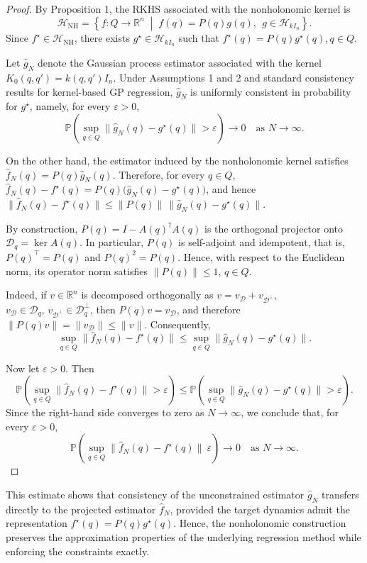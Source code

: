 \documentclass[letterpaper, 10 pt, conference]{ieeeconf}
\begin{document}
\begin{proof}
By Proposition 1, the RKHS associated with the nonholonomic kernel is
\[
\mathcal H_{\mathrm{NH}}
=
\left\{
f:Q\to\mathbb R^n
\;\middle|\;
f(q)=P(q)g(q),\ \ g\in\mathcal H_{kI_n}
\right\}.
\]
Since $f^\star\in\mathcal H_{\mathrm{NH}}$, there exists $g^\star\in\mathcal H_{kI_n}$ such that $f^\star(q)=P(q)g^\star(q)$,\,$q\in Q$.


Let $\hat g_N$ denote the Gaussian process estimator associated with the kernel
$K_0(q,q')=k(q,q')I_n$. Under Assumptions 1 and 2 and standard consistency results for kernel-based GP regression, $\hat g_N$ is uniformly consistent in probability for $g^\star$, namely, for every $\varepsilon>0$,
\[
\mathbb{P}\!\left(
\sup_{q\in Q}\|\hat g_N(q)-g^\star(q)\|>\varepsilon
\right)\to 0
\quad\text{as }N\to\infty.
\]

On the other hand, the estimator induced by the nonholonomic kernel satisfies
$\hat f_N(q)=P(q)\hat g_N(q)$. Therefore, for every $q\in Q$, $\hat f_N(q)-f^\star(q)
=
P(q)\bigl(\hat g_N(q)-g^\star(q)\bigr)$,
and hence $\|\hat f_N(q)-f^\star(q)\|
\le
\|P(q)\|\,\|\hat g_N(q)-g^\star(q)\|$.


By construction, $P(q)=I-A(q)^\dagger A(q)$ is the orthogonal projector onto  $\mathcal D_q=\ker A(q)$. In particular, $P(q)$ is self-adjoint and idempotent, that is, $P(q)^\top=P(q)$ and $P(q)^2=P(q)$. Hence, with respect to the Euclidean norm, its operator norm satisfies $\|P(q)\|\le 1$, $q\in Q$. 

Indeed, if $v\in\mathbb R^n$ is decomposed orthogonally as $v=v_{\mathcal D}+v_{\mathcal D^\perp}$,
$v_{\mathcal D}\in\mathcal D_q,\, v_{\mathcal D^\perp}\in\mathcal D_q^\perp$,
then $P(q)v=v_{\mathcal D}$, and therefore
$\|P(q)v\|=\|v_{\mathcal D}\|\le \|v\|.$ Consequently,
\[
\sup_{q\in Q}\|\hat f_N(q)-f^\star(q)\|
\le
\sup_{q\in Q}\|\hat g_N(q)-g^\star(q)\|.
\]

Now let $\varepsilon>0$. Then
\[
\mathbb{P}\!\left(
\sup_{q\in Q}\|\hat f_N(q)\!-\!f^\star(q)\|\!>\!\varepsilon\!
\right)
\!\le\!
\mathbb{P}\!\left(
\sup_{q\in Q}\|\hat g_N(q)\!-\!g^\star(q)\|\!>\!\varepsilon\!
\right)\!.
\]
Since the right-hand side converges to zero as $N\to\infty$, we conclude that, for every $\varepsilon>0$,
\[
\mathbb{P}\!\left(
\sup_{q\in Q}\|\hat f_N(q)-f^\star(q)\|\>\varepsilon
\right)\to 0
\quad\text{as }N\to\infty.
\] \end{proof}


This estimate shows that consistency of the unconstrained estimator $\hat g_N$ transfers directly to the projected estimator $\hat f_N$, provided the target dynamics admit the representation $f^\star(q)=P(q)g^\star(q)$. Hence, the nonholonomic construction preserves the approximation properties of the underlying regression method while enforcing the constraints exactly.
\end{document}
